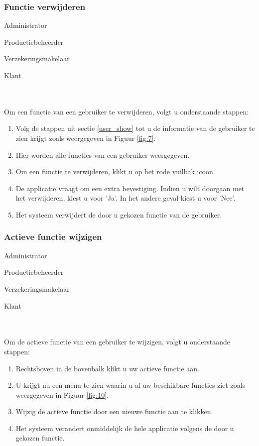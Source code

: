 \documentclass[11pt,openany]{article}
\newcommand{\cmark}{\ding{51}}%
\newcommand{\xmark}{\ding{55}}%
\newcommand{\done}{\rlap{$\square$}{\raisebox{2pt}{\large\hspace{1pt}\cmark}}%
	\hspace{-2.5pt}}
\newcommand{\wontfix}{\rlap{$\square$}{\large\hspace{1pt}\xmark}}
\begin{document}
\subsubsection{Functie verwijderen}
\begin{todolist}
	\item[\done] Administrator
	\item[\wontfix] Productiebeheerder
	\item[\wontfix] Verzekeringsmakelaar
	\item[\wontfix] Klant 
\end{todolist}
\\
\\
Om een functie van een gebruiker te verwijderen, volgt u onderstaande stappen:
\begin{enumerate}
	\item Volg de stappen uit sectie \ref{user_show} tot u de informatie van de gebruiker te zien krijgt zoals weergegeven in Figuur \ref{fig:7}.
	\item Hier worden alle functies van een gebruiker weergegeven.
	\item Om een functie te verwijderen, klikt u op het rode vuilbak icoon.
	\item De applicatie vraagt om een extra bevestiging. Indien u wilt doorgaan met het verwijderen, kiest u voor 'Ja'. In het andere geval kiest u voor 'Nee'.
	\item Het systeem verwijdert de door u gekozen functie van de gebruiker.
\end{enumerate}



\subsubsection{Actieve functie wijzigen}

\label{function_change}
\begin{todolist}
	\item[\done] Administrator
	\item[\done] Productiebeheerder
	\item[\done] Verzekeringsmakelaar
	\item[\done] Klant 
\end{todolist}
\\
\\
Om de actieve functie van een gebruiker te wijzigen, volgt u onderstaande stappen:
\begin{enumerate}
	\item Rechtsboven in de bovenbalk klikt u uw actieve functie aan.
	\item U krijgt nu een menu te zien waarin u al uw beschikbare functies ziet zoals weergegeven in Figuur \ref{fig:10}.
	\item Wijzig de actieve functie door een nieuwe functie aan te klikken.
	\item Het systeem verandert onmiddelijk de hele applicatie volgens de door u gekozen functie.
\end{enumerate}
\end{document}
